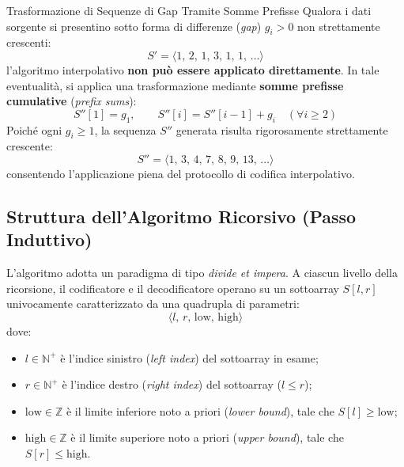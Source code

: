 \begin{alertblock}{Trasformazione di Sequenze di Gap Tramite Somme Prefisse}
Qualora i dati sorgente si presentino sotto forma di differenze (\textit{gap}) $g_i > 0$ non strettamente crescenti:
\begin{equation*}
  S' = \langle 1, \, 2, \, 1, \, 3, \, 1, \, 1, \, \dots \rangle
\end{equation*}
l'algoritmo interpolativo \textbf{non pu\`o essere applicato direttamente}.
In tale eventualit\`a, si applica una trasformazione mediante \textbf{somme prefisse cumulative} (\textit{prefix sums}):
\begin{equation}
  S''[1] = g_1, \qquad S''[i] = S''[i-1] + g_i \quad (\forall i \ge 2)
\end{equation}
Poich\'e ogni $g_i \ge 1$, la sequenza $S''$ generata risulta rigorosamente strettamente crescente:
\begin{equation*}
  S'' = \langle 1, \, 3, \, 4, \, 7, \, 8, \, 9, \, 13, \, \dots \rangle
\end{equation*}
consentendo l'applicazione piena del protocollo di codifica interpolativo.
\end{alertblock}

\FloatBarrier
\subsection{Struttura dell'Algoritmo Ricorsivo (Passo Induttivo)}
\label{subsec:passo-induttivo-interpolative}

L'algoritmo adotta un paradigma di tipo \textit{divide et impera}. A ciascun livello della ricorsione, il codificatore e il decodificatore operano su un sottoarray $S[l, r]$ univocamente caratterizzato da una quadrupla di parametri:
\begin{equation}
  \langle l, \, r, \, \text{low}, \, \text{high} \rangle
\end{equation}
dove:
\begin{itemize}
  \item $l \in \mathbb{N}^+$ \`e l'indice sinistro (\textit{left index}) del sottoarray in esame;
  \item $r \in \mathbb{N}^+$ \`e l'indice destro (\textit{right index}) del sottoarray ($l \le r$);
  \item $\text{low} \in \mathbb{Z}$ \`e il limite inferiore noto a priori (\textit{lower bound}), tale che $S[l] \ge \text{low}$;
  \item $\text{high} \in \mathbb{Z}$ \`e il limite superiore noto a priori (\textit{upper bound}), tale che $S[r] \le \text{high}$.
\end{itemize}


